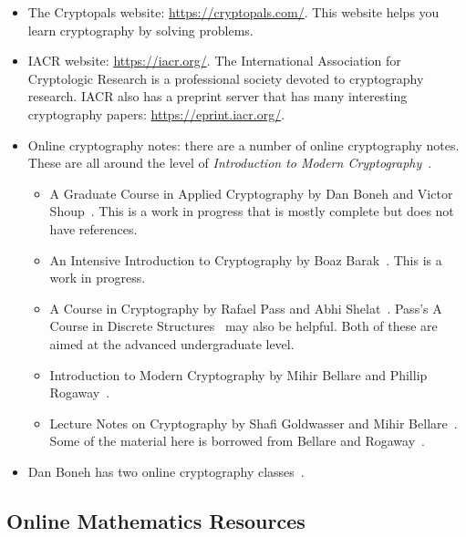 \begin{itemize}
\item The Cryptopals website: \url{https://cryptopals.com/}.
    This website helps you learn cryptography by solving problems.
\item IACR website: \url{https://iacr.org/}.
    The International Association for Cryptologic Research
    is a professional society devoted to cryptography research.
    IACR also has a preprint server that has many interesting
    cryptography papers: \url{https://eprint.iacr.org/}.
\item Online cryptography notes:
    there are a number of online cryptography notes.
    These are all around the level of
    \emph{Introduction to Modern Cryptography}~\cite{IntroModernCrypto}.

    \begin{itemize}
    \item A Graduate Course in Applied Cryptography
        by Dan Boneh and Victor Shoup~\cite{BonehShoupGraduateApplied}.
        This is a work in progress that is mostly complete
        but does not have references.
    \item An Intensive Introduction to Cryptography
        by Boaz Barak~\cite{IntensiveCrypto}.
        This is a work in progress.
    \item A Course in Cryptography
        by Rafael Pass and Abhi Shelat~\cite{CourseCrypto}.
        Pass's A Course in Discrete Structures~\cite{CourseDiscreteStructures}
        may also be helpful.
        Both of these are aimed at the advanced undergraduate level.
    \item Introduction to Modern Cryptography
        by Mihir Bellare and Phillip Rogaway~\cite{BellareRogawayIMC}.
    \item Lecture Notes on Cryptography
        by Shafi Goldwasser and Mihir Bellare~\cite{GoldwasserBellareLNC}.
        Some of the material here is borrowed from
        Bellare and Rogaway~\cite{BellareRogawayIMC}.
    \end{itemize}
\item Dan Boneh has two online cryptography
    classes~\cite{BonehCourseraCryptoI,BonehCourseraCryptoII}.
\end{itemize}

\subsection{Online Mathematics Resources}
\label{ssec:conclusion_online_math}

